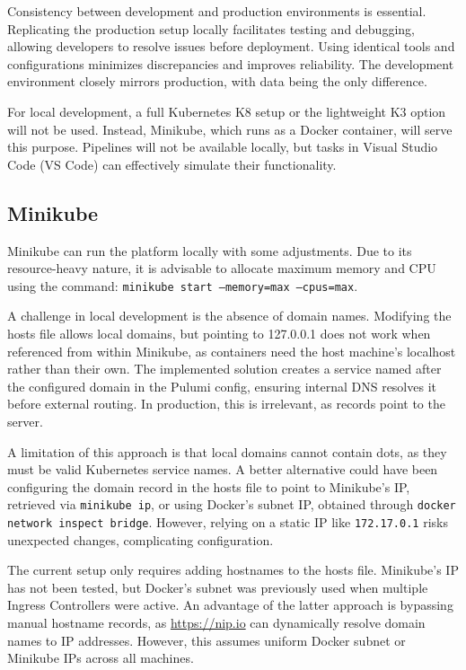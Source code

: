 Consistency between development and production environments is essential. Replicating the production setup locally facilitates testing and debugging, allowing developers to resolve issues before deployment. Using identical tools and configurations minimizes discrepancies and improves reliability. The development environment closely mirrors production, with data being the only difference.

For local development, a full Kubernetes K8 setup or the lightweight K3 option will not be used. Instead, Minikube, which runs as a Docker container, will serve this purpose. Pipelines will not be available locally, but tasks in Visual Studio Code (VS Code) can effectively simulate their functionality.

\subsection{Minikube}
Minikube can run the platform locally with some adjustments. Due to its resource-heavy nature, it is advisable to allocate maximum memory and CPU using the command: \texttt{minikube start --memory=max --cpus=max}.

A challenge in local development is the absence of domain names. Modifying the hosts file allows local domains, but pointing to 127.0.0.1 does not work when referenced from within Minikube, as containers need the host machine's localhost rather than their own. The implemented solution creates a service named after the configured domain in the Pulumi config, ensuring internal DNS resolves it before external routing. In production, this is irrelevant, as records point to the server.

A limitation of this approach is that local domains cannot contain dots, as they must be valid Kubernetes service names. A better alternative could have been configuring the domain record in the hosts file to point to Minikube's IP, retrieved via \texttt{minikube ip}, or using Docker's subnet IP, obtained through \texttt{docker network inspect bridge}. However, relying on a static IP like \texttt{172.17.0.1} risks unexpected changes, complicating configuration.

The current setup only requires adding hostnames to the hosts file. Minikube's IP has not been tested, but Docker's subnet was previously used when multiple Ingress Controllers were active. An advantage of the latter approach is bypassing manual hostname records, as \url{https://nip.io} can dynamically resolve domain names to IP addresses. However, this assumes uniform Docker subnet or Minikube IPs across all machines.


